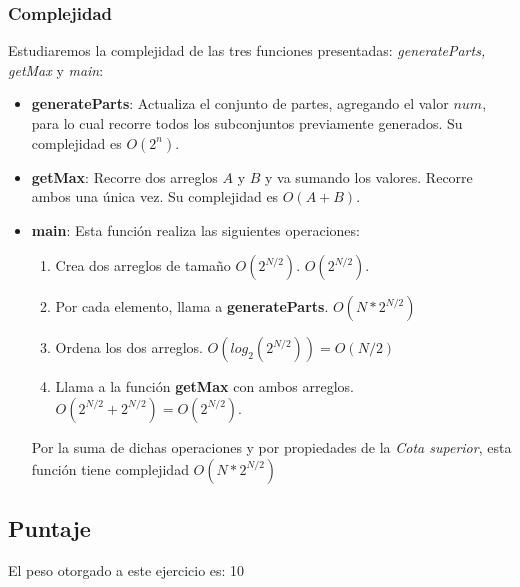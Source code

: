 \subsubsection{Complejidad}
Estudiaremos la complejidad de las tres funciones presentadas: \emph{generateParts, getMax} y \emph{main}:
\begin{itemize}
	\item \textbf{generateParts}: Actualiza el conjunto de partes, agregando el valor $num$, para lo cual recorre todos los subconjuntos previamente generados. Su complejidad es $O(2^n)$.
	\item \textbf{getMax}: Recorre dos arreglos $A$ y $B$ y va sumando los valores. Recorre ambos una única vez. Su complejidad es $O(A+B)$.
	\item \textbf{main}: Esta función realiza las siguientes operaciones:
	\begin{enumerate}
		\item Crea dos arreglos de tamaño $O(2^{N/2})$. $O(2^{N/2})$.
		\item Por cada elemento, llama a \textbf{generateParts}. $O(N*2^{N/2})$
		\item Ordena los dos arreglos. $O(log_{2}(2^{N/2})) = O(N/2)$
		\item Llama a la función \textbf{getMax} con ambos arreglos. $O(2^{N/2} + 2^{N/2}) = O(2^{N/2})$.
	\end{enumerate}
	Por la suma de dichas operaciones y por propiedades de la \emph{Cota superior}, esta función tiene complejidad $O(N*2^{N/2})$
\end{itemize}

\subsection{Puntaje}
El peso otorgado a este ejercicio es: 10